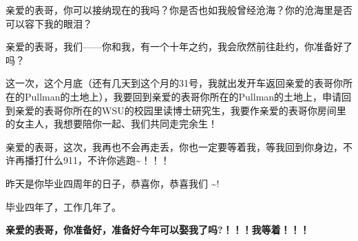 \documentclass[9pt, b5paper]{article}
\begin{document}
亲爱的表哥，你可以接纳现在的我吗？你是否也如我般曾经沧海？你的沧海里是否可以容下我的眼泪？

亲爱的表哥，我们——你和我，有一个十年之约，我会欣然前往赴约，你准备好了吗？

这一次，这个月底（还有几天到这个月的31号，我就出发开车返回亲爱的表哥你所在的Pullman的土地上），我要回到亲爱的表哥你所在的Pullman的土地上，申请回到亲爱的表哥你所在的WSU的校园里读博士研究生，我要作亲爱的表哥你房间里的女主人，我想要陪你一起、我们共同走完余生！

亲爱的表哥，这次，我再也不会再走丢，你也一定要等着我，等我回到你身边，不许再播打什么911，不许你逃跑\textasciitilde{}！！！

昨天是你毕业四周年的日子，恭喜你，恭喜我们 \textasciitilde{}! 

毕业四年了，工作几年了。 

\textbf{亲爱的表哥，你准备好，准备好今年可以娶我了吗?！！！我等着！！！}
\end{document}
